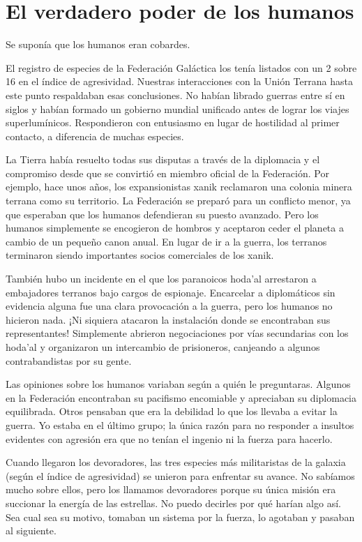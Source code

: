 ﻿\chapter{El verdadero poder de los humanos}\label{sec:el-verdadero-poder-de-los-humanos}

Se suponía que los humanos eran cobardes.

El registro de especies de la Federación Galáctica los tenía listados con un 2 sobre 16 en el índice de agresividad. Nuestras interacciones con la Unión Terrana hasta este punto respaldaban esas conclusiones. No habían librado guerras entre sí en siglos y habían formado un gobierno mundial unificado antes de lograr los viajes superlumínicos. Respondieron con entusiasmo en lugar de hostilidad al primer contacto, a diferencia de muchas especies.

La Tierra había resuelto todas sus disputas a través de la diplomacia y el compromiso desde que se convirtió en miembro oficial de la Federación. Por ejemplo, hace unos años, los expansionistas xanik reclamaron una colonia minera terrana como su territorio. La Federación se preparó para un conflicto menor, ya que esperaban que los humanos defendieran su puesto avanzado. Pero los humanos simplemente se encogieron de hombros y aceptaron ceder el planeta a cambio de un pequeño canon anual. En lugar de ir a la guerra, los terranos terminaron siendo importantes socios comerciales de los xanik.

También hubo un incidente en el que los paranoicos hoda'al arrestaron a embajadores terranos bajo cargos de espionaje. Encarcelar a diplomáticos sin evidencia alguna fue una clara provocación a la guerra, pero los humanos no hicieron nada. ¡Ni siquiera atacaron la instalación donde se encontraban sus representantes! Simplemente abrieron negociaciones por vías secundarias con los hoda'al y organizaron un intercambio de prisioneros, canjeando a algunos contrabandistas por su gente.

Las opiniones sobre los humanos variaban según a quién le preguntaras. Algunos en la Federación encontraban su pacifismo encomiable y apreciaban su diplomacia equilibrada. Otros pensaban que era la debilidad lo que los llevaba a evitar la guerra. Yo estaba en el último grupo; la única razón para no responder a insultos evidentes con agresión era que no tenían el ingenio ni la fuerza para hacerlo.

Cuando llegaron los devoradores, las tres especies más militaristas de la galaxia (según el índice de agresividad) se unieron para enfrentar su avance. No sabíamos mucho sobre ellos, pero los llamamos devoradores porque su única misión era succionar la energía de las estrellas. No puedo decirles por qué harían algo así. Sea cual sea su motivo, tomaban un sistema por la fuerza, lo agotaban y pasaban al siguiente.

